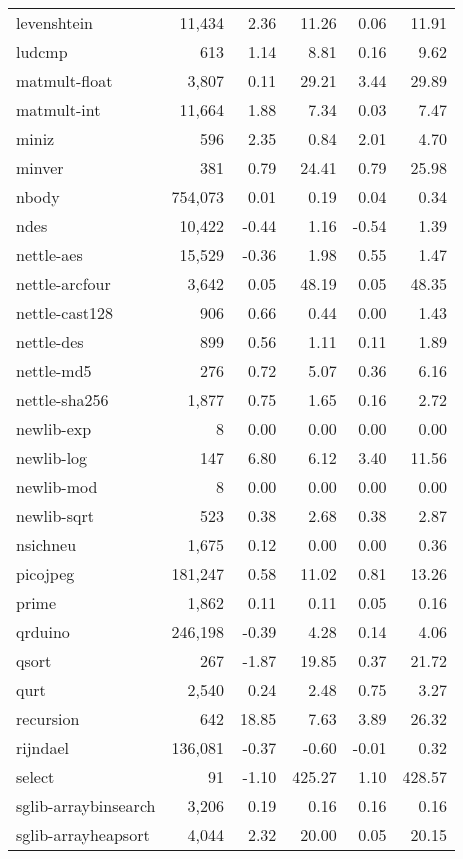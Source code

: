 \begin{table}[ptb]
{\begin{tabular}{@{}lrrrrr@{}}
levenshtein & 11,434 & 2.36 & 11.26 & 0.06 & 11.91 \\
ludcmp & 613 & 1.14 & 8.81 & 0.16 & 9.62 \\
matmult-float & 3,807 & 0.11 & 29.21 & 3.44 & 29.89 \\
matmult-int & 11,664 & 1.88 & 7.34 & 0.03 & 7.47 \\
miniz & 596 & 2.35 & 0.84 & 2.01 & 4.70 \\
minver & 381 & 0.79 & 24.41 & 0.79 & 25.98 \\
nbody & 754,073 & 0.01 & 0.19 & 0.04 & 0.34 \\
ndes & 10,422 & -0.44 & 1.16 & -0.54 & 1.39 \\
nettle-aes & 15,529 & -0.36 & 1.98 & 0.55 & 1.47 \\
nettle-arcfour & 3,642 & 0.05 & 48.19 & 0.05 & 48.35 \\
nettle-cast128 & 906 & 0.66 & 0.44 & 0.00 & 1.43 \\
nettle-des & 899 & 0.56 & 1.11 & 0.11 & 1.89 \\
nettle-md5 & 276 & 0.72 & 5.07 & 0.36 & 6.16 \\
nettle-sha256 & 1,877 & 0.75 & 1.65 & 0.16 & 2.72 \\
newlib-exp & 8 & 0.00 & 0.00 & 0.00 & 0.00 \\
newlib-log & 147 & 6.80 & 6.12 & 3.40 & 11.56 \\
newlib-mod & 8 & 0.00 & 0.00 & 0.00 & 0.00 \\
newlib-sqrt & 523 & 0.38 & 2.68 & 0.38 & 2.87 \\
nsichneu & 1,675 & 0.12 & 0.00 & 0.00 & 0.36 \\
picojpeg & 181,247 & 0.58 & 11.02 & 0.81 & 13.26 \\
prime & 1,862 & 0.11 & 0.11 & 0.05 & 0.16 \\
qrduino & 246,198 & -0.39 & 4.28 & 0.14 & 4.06 \\
qsort & 267 & -1.87 & 19.85 & 0.37 & 21.72 \\
qurt & 2,540 & 0.24 & 2.48 & 0.75 & 3.27 \\
recursion & 642 & 18.85 & 7.63 & 3.89 & 26.32 \\
rijndael & 136,081 & -0.37 & -0.60 & -0.01 & 0.32 \\
select & 91 & -1.10 & 425.27 & 1.10 & 428.57 \\
sglib-arraybinsearch & 3,206 & 0.19 & 0.16 & 0.16 & 0.16 \\
sglib-arrayheapsort & 4,044 & 2.32 & 20.00 & 0.05 & 20.15 \\

\end{tabular}}
\end{table}
